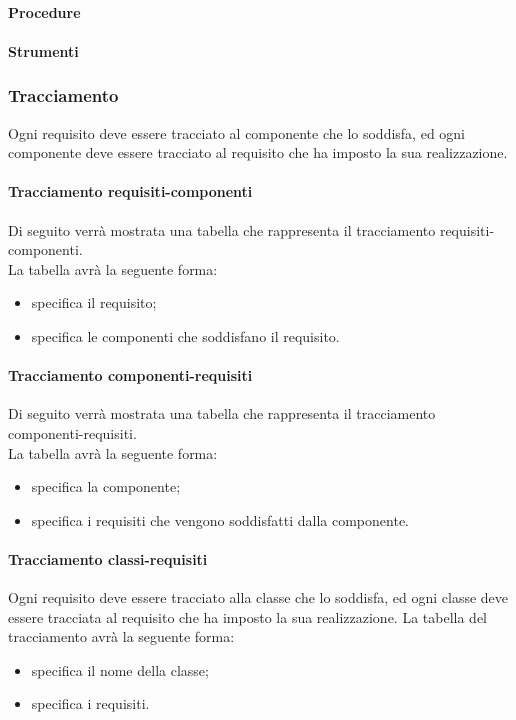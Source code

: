 \paragraph{Procedure}

\paragraph{Strumenti}


\subsubsection{Tracciamento}

Ogni requisito deve essere tracciato al componente che lo soddisfa, ed ogni componente deve essere tracciato al requisito che ha imposto la sua realizzazione.

\paragraph{Tracciamento requisiti-componenti}
Di seguito verrà mostrata una tabella che rappresenta il tracciamento requisiti-componenti. \\
La tabella avrà la seguente forma:
\begin{itemize}
\item {}specifica il requisito;
\item {}specifica le componenti che soddisfano il requisito.
\end{itemize}

\paragraph{Tracciamento componenti-requisiti}
Di seguito verrà mostrata una tabella che rappresenta il tracciamento componenti-requisiti. \\
La tabella avrà la seguente forma:
\begin{itemize}
\item {}specifica la componente;
\item {}specifica i requisiti che vengono soddisfatti dalla componente.
\end{itemize}

\paragraph{Tracciamento classi-requisiti}
Ogni requisito deve essere tracciato alla classe che lo soddisfa, ed ogni classe deve essere tracciata al requisito che ha imposto la sua realizzazione.
La tabella del tracciamento avrà la seguente forma:
\begin{itemize}
\item {}specifica il nome della classe;
\item {}specifica i requisiti.
\end{itemize}
